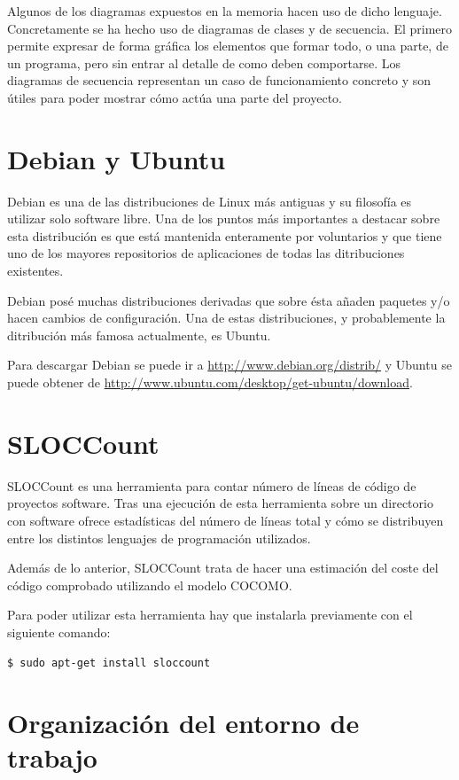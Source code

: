 Algunos de los diagramas expuestos en la memoria hacen uso de dicho lenguaje. Concretamente se ha hecho uso de diagramas de clases y de secuencia. El primero permite expresar de forma gráfica los elementos que formar todo, o una parte, de un programa, pero sin entrar al detalle de como deben comportarse. Los diagramas de secuencia representan un caso de funcionamiento concreto y son útiles para poder mostrar cómo actúa una parte del proyecto.

\section{Debian y Ubuntu}

Debian es una de las distribuciones de Linux más antiguas y su filosofía es utilizar solo software libre. Una de los puntos más importantes a destacar sobre esta distribución es que está mantenida enteramente por voluntarios y que tiene uno de los mayores repositorios de aplicaciones de todas las ditribuciones existentes.

Debian posé muchas distribuciones derivadas que sobre ésta añaden paquetes y/o hacen cambios de configuración. Una de estas distribuciones, y probablemente la ditribución más famosa actualmente, es Ubuntu.

Para descargar Debian se puede ir a \url{http://www.debian.org/distrib/} y Ubuntu se puede obtener de \url{http://www.ubuntu.com/desktop/get-ubuntu/download}.

\section{SLOCCount}

SLOCCount es una herramienta para contar número de líneas de código de proyectos software. Tras una ejecución de esta herramienta sobre un directorio con software ofrece estadísticas del número de líneas total y cómo se distribuyen entre los distintos lenguajes de programación utilizados.

Además de lo anterior, SLOCCount trata de hacer una estimación del coste del código comprobado utilizando el modelo COCOMO.

Para poder utilizar esta herramienta hay que instalarla previamente con el siguiente comando:

\begin{verbatim}
$ sudo apt-get install sloccount
\end{verbatim}

\section{Organización del entorno de trabajo}

